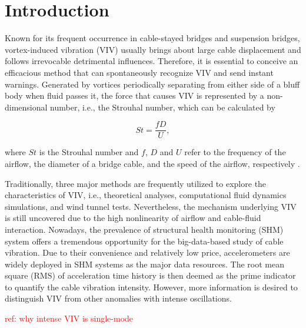\documentclass[preprint, 3p, times, compress, 11pt]{elsarticle}
\begin{document}
\section{Introduction}

Known for its frequent occurrence in cable-stayed bridges and suspension 
bridges, vortex-induced vibration (VIV) usually brings about large cable 
displacement and follows irrevocable detrimental influences. Therefore, 
it is essential to conceive an efficacious method that can spontaneously 
recognize VIV and send instant warnings. Generated by vortices 
periodically separating from either side of a bluff body when fluid 
passes it, the force that causes VIV is represented by a non-dimensional 
number, i.e., the Strouhal number, which can be calculated by 

\begin{equation}
    St = \frac{fD}{U},
    \label{eq:Strouhal}
\end{equation}

where $St$ is the Strouhal number and $f$, $D$ and $U$ refer to the 
frequency of the airflow, the diameter of a bridge 
cable, and the speed of the airflow, respectively \cite{jafari2020windinduced}. 

Traditionally, three major methods are frequently utilized to explore 
the characteristics of VIV, i.e., theoretical analyses, computational fluid 
dynamics simulations, and wind tunnel tests. Nevertheless, the mechanism 
underlying VIV is still uncovered due to the high nonlinearity of 
airflow and cable-fluid interaction. Nowadays, the prevalence of 
structural health monitoring (SHM) system offers a tremendous 
opportunity for the big-data-based study of cable vibration. Due to 
their convenience and relatively low price, accelerometers are widely 
deployed in SHM systems as the major data resources. The root mean square 
(RMS) of acceleration time history is then deemed as the prime indicator 
to quantify the cable vibration intensity. However, more information is 
desired to distinguish VIV from other anomalies with intense oscillations. 

\textcolor{red}{
    ref: why intense VIV is single-mode
}
\end{document}

